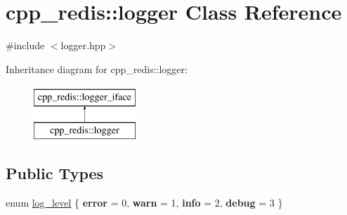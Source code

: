 \hypertarget{classcpp__redis_1_1logger}{}\section{cpp\+\_\+redis\+:\+:logger Class Reference}
\label{classcpp__redis_1_1logger}


{\ttfamily \#include $<$logger.\+hpp$>$}

Inheritance diagram for cpp\+\_\+redis\+:\+:logger\+:\begin{figure}[H]
\begin{center}
\leavevmode
\includegraphics[height=2.000000cm]{classcpp__redis_1_1logger}
\end{center}
\end{figure}
\subsection*{Public Types}
\begin{DoxyCompactItemize}
\item 
enum \mbox{\hyperlink{classcpp__redis_1_1logger_a9493594d547e7abe71b8690be1946c7a}{log\+\_\+level}} \{ {\bfseries error} = 0, 
{\bfseries warn} = 1, 
{\bfseries info} = 2, 
{\bfseries debug} = 3
 \}
\end{DoxyCompactItemize}
